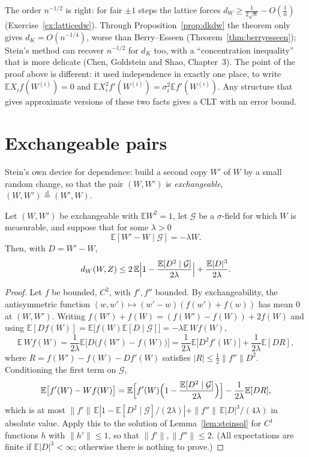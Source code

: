 The order $n^{-1/2}$ is right: for fair $\pm1$ steps the lattice forces $d_W\ge\frac1{2\sqrt n}-O(\frac1n)$ (Exercise~\ref{ex:latticedw}). Through
Proposition~\ref{prop:dkdw} the theorem only gives $d_K=O(n^{-1/4})$, worse than Berry--Esseen (Theorem~\ref{thm:berryesseen}); Stein's method can recover
$n^{-1/2}$ for $d_K$ too, with a ``concentration inequality'' that is more delicate (Chen, Goldstein and Shao, Chapter~3). The point of the proof above is
different: it used independence in exactly one place, to write $\mathbb EX_if(W^{(i)})=0$ and $\mathbb EX_i^2f'(W^{(i)})=\sigma_i^2\mathbb Ef'(W^{(i)})$. Any structure
that gives approximate versions of these two facts gives a CLT with an error bound.

\section{Exchangeable pairs}

Stein's own device for dependence: build a second copy $W'$ of $W$ by a small random change, so that the pair $(W,W')$ is \emph{exchangeable},
$(W,W')\overset{\mathrm d}=(W',W)$.

\begin{theorem}\label{thm:exch}
Let $(W,W')$ be exchangeable with $\mathbb EW^2=1$, let $\mathcal G$ be a $\sigma$-field for which $W$ is measurable, and suppose that for some $\lambda>0$
\[
\mathbb E[W'-W\mid\mathcal G]=-\lambda W.
\]
Then, with $D=W'-W$,
\[
d_W(W,Z)\le2\,\mathbb E\Bigl|1-\frac{\mathbb E[D^2\mid\mathcal G]}{2\lambda}\Bigr|+\frac{\mathbb E|D|^3}{2\lambda}.
\]
\end{theorem}
\begin{proof}
Let $f$ be bounded, $C^2$, with $f',f''$ bounded. By exchangeability, the antisymmetric function $(w,w')\mapsto(w'-w)(f(w')+f(w))$ has mean $0$ at $(W,W')$.
Writing $f(W')+f(W)=(f(W')-f(W))+2f(W)$ and using $\mathbb E[Df(W)]=\mathbb E\bigl[f(W)\mathbb E[D\mid\mathcal G]\bigr]=-\lambda\mathbb E\,Wf(W)$,
\[
\mathbb E\,Wf(W)=\frac1{2\lambda}\mathbb E\bigl[D\bigl(f(W')-f(W)\bigr)\bigr]=\frac1{2\lambda}\mathbb E\bigl[D^2f'(W)\bigr]+\frac1{2\lambda}\mathbb E[DR],
\]
where $R=f(W')-f(W)-Df'(W)$ satisfies $|R|\le\frac12\|f''\|D^2$. Conditioning the first term on $\mathcal G$,
\[
\mathbb E\bigl[f'(W)-Wf(W)\bigr]=\mathbb E\Bigl[f'(W)\Bigl(1-\frac{\mathbb E[D^2\mid\mathcal G]}{2\lambda}\Bigr)\Bigr]-\frac1{2\lambda}\mathbb E[DR],
\]
which is at most $\|f'\|\,\mathbb E|1-\mathbb E[D^2\mid\mathcal G]/(2\lambda)|+\|f''\|\,\mathbb E|D|^3/(4\lambda)$ in absolute value. Apply this to the solution of Lemma~\ref{lem:steinsol}
for $C^1$ functions $h$ with $\|h'\|\le1$, so that $\|f'\|,\|f''\|\le2$. (All expectations are finite if $\mathbb E|D|^3<\infty$; otherwise there is nothing to prove.)
\end{proof}


